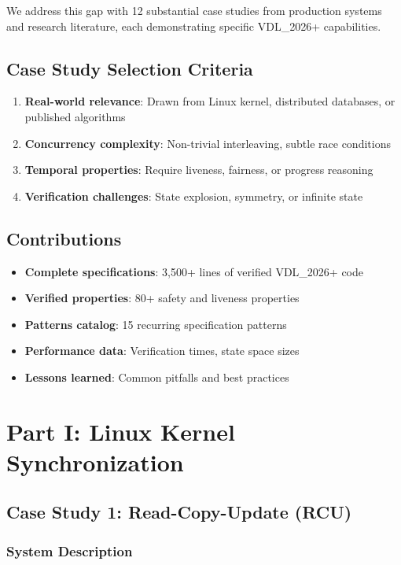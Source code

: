 \documentclass[conference]{IEEEtran}
\begin{document}
We address this gap with 12 substantial case studies from production systems and research literature, each demonstrating specific VDL\_2026+ capabilities.

\subsection{Case Study Selection Criteria}

\begin{enumerate}
\item \textbf{Real-world relevance}: Drawn from Linux kernel, distributed databases, or published algorithms
\item \textbf{Concurrency complexity}: Non-trivial interleaving, subtle race conditions
\item \textbf{Temporal properties}: Require liveness, fairness, or progress reasoning
\item \textbf{Verification challenges}: State explosion, symmetry, or infinite state
\end{enumerate}

\subsection{Contributions}

\begin{itemize}
\item \textbf{Complete specifications}: 3,500+ lines of verified VDL\_2026+ code
\item \textbf{Verified properties}: 80+ safety and liveness properties
\item \textbf{Patterns catalog}: 15 recurring specification patterns
\item \textbf{Performance data}: Verification times, state space sizes
\item \textbf{Lessons learned}: Common pitfalls and best practices
\end{itemize}

\section{Part I: Linux Kernel Synchronization}

\subsection{Case Study 1: Read-Copy-Update (RCU)}

\subsubsection{System Description}
\end{document}
